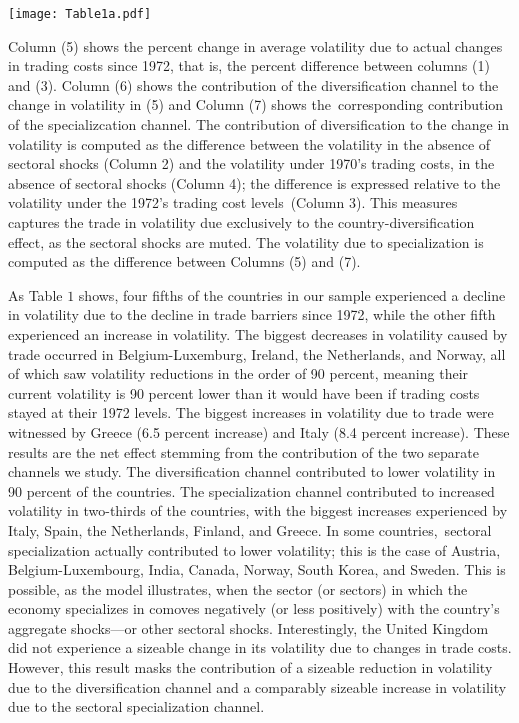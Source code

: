 \documentclass[12pt]{article}
\begin{document}
\begin{table}[h]
\caption{Baseline and counterfactual changes in volatility (measured as
variance) due to changes in trading costs. Baseline calibration ($\protect%
\theta =4$)}\centering\texttt{[image: Table1a.pdf]}
\end{table}

Column (5) shows the percent change in average volatility due to actual
changes in trading costs since 1972, that is, the percent difference between
columns (1) and (3). Column (6) shows the contribution of the
diversification channel to the change in volatility in (5) and Column (7)
shows the\ corresponding contribution of the specializcation channel. The
contribution of diversification to the change in volatility is computed as
the difference between the volatility in the absence of sectoral shocks
(Column 2) and the volatility under 1970's trading costs, in the absence of
sectoral shocks (Column 4); the difference is expressed relative to the
volatility under the 1972's trading cost levels\ (Column 3). This measures
captures the trade in volatility due exclusively to the
country-diversification effect, as the sectoral shocks are muted. The
volatility due to specialization is computed as the difference between
Columns (5) and (7).

As Table $1$ shows, four fifths of the countries in our sample experienced a
decline in volatility due to the decline in trade barriers since 1972, while
the other fifth experienced an increase in volatility. The biggest decreases
in volatility caused by trade occurred in Belgium-Luxemburg, Ireland, the
Netherlands, and Norway, all of which saw volatility reductions in the order
of 90 percent, meaning their current volatility is 90 percent lower than it
would have been if trading costs stayed at their 1972 levels. The biggest
increases in volatility due to trade were witnessed by Greece (6.5 percent
increase) and Italy (8.4 percent increase). These results are the net effect
stemming from the contribution of the two separate channels we study. The
diversification channel contributed to lower volatility in 90 percent of the
countries. The specialization channel contributed to increased volatility in
two-thirds of the countries, with the biggest increases experienced by
Italy, Spain, the Netherlands, Finland, and Greece. In some countries,\
sectoral specialization actually contributed to lower volatility; this is
the case of Austria, Belgium-Luxembourg, India, Canada, Norway, South Korea,
and Sweden. This is possible, as the model illustrates, when the sector (or
sectors) in which the economy specializes in comoves negatively (or less
positively) with the country's aggregate shocks---or other sectoral shocks.
Interestingly, the United Kingdom did not experience a sizeable change in
its volatility due to changes in trade costs. However, this result masks the
contribution of a sizeable reduction in volatility due to the
diversification channel and a comparably sizeable increase in volatility due
to the sectoral specialization channel.
\end{document}
